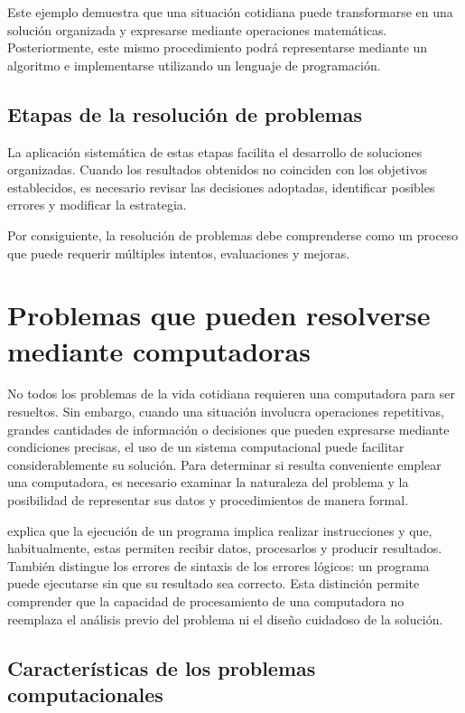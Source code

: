Este ejemplo demuestra que una situación cotidiana puede transformarse en una solución organizada y expresarse mediante operaciones matemáticas. Posteriormente, este mismo procedimiento podrá representarse mediante un algoritmo e implementarse utilizando un lenguaje de programación.

\subsection{Etapas de la resolución de problemas}


La aplicación sistemática de estas etapas facilita el desarrollo de soluciones organizadas. Cuando los resultados obtenidos no coinciden con los objetivos establecidos, es necesario revisar las decisiones adoptadas, identificar posibles errores y modificar la estrategia.

Por consiguiente, la resolución de problemas debe comprenderse como un proceso que puede requerir múltiples intentos, evaluaciones y mejoras.

\section{Problemas que pueden resolverse mediante computadoras}

No todos los problemas de la vida cotidiana requieren una computadora para ser resueltos. Sin embargo, cuando una situación involucra operaciones repetitivas, grandes cantidades de información o decisiones que pueden expresarse mediante condiciones precisas, el uso de un sistema computacional puede facilitar considerablemente su solución. Para determinar si resulta conveniente emplear una computadora, es necesario examinar la naturaleza del problema y la posibilidad de representar sus datos y procedimientos de manera formal.

\textcite[pp.~4–6]{farrell2013} explica que la ejecución de un programa implica realizar instrucciones y que, habitualmente, estas permiten recibir datos, procesarlos y producir resultados. También distingue los errores de sintaxis de los errores lógicos: un programa puede ejecutarse sin que su resultado sea correcto. Esta distinción permite comprender que la capacidad de procesamiento de una computadora no reemplaza el análisis previo del problema ni el diseño cuidadoso de la solución.

\subsection{Características de los problemas computacionales}

